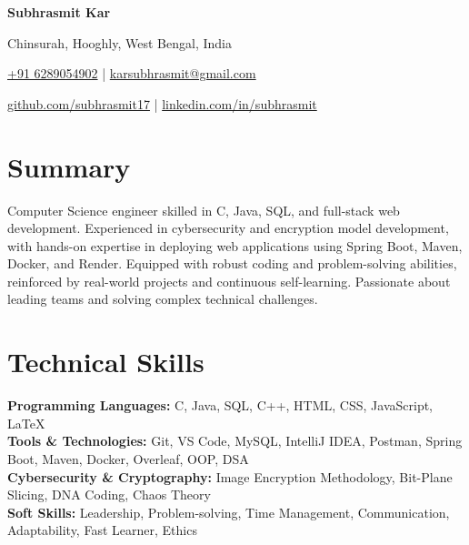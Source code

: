 \documentclass[a4paper,10pt]{article}
\begin{document}
\begin{center}
    {\fontsize{22}{24}\selectfont\textbf{Subhrasmit Kar}} \par
    
    \vspace{-0.3em}
    
    Chinsurah, Hooghly, West Bengal, India \par
    
    \vspace{-0.3em}
    
    \href{tel:+916289054902}{+91 6289054902} \quad | \quad \href{mailto:karsubhrasmit@gmail.com}{karsubhrasmit@gmail.com} \par
    
    \vspace{-0.5em}
    
    \href{https://github.com/subhrasmit17}{github.com/subhrasmit17} \quad | \quad \href{https://linkedin.com/in/subhrasmit}{linkedin.com/in/subhrasmit}
\end{center}



\vspace{-0.3em} %



\section*{Summary}
Computer Science engineer skilled in C, Java, SQL, and full-stack web development. Experienced in cybersecurity and encryption model development, with hands-on expertise in deploying web applications using Spring Boot, Maven, Docker, and Render. Equipped with robust coding and problem-solving abilities, reinforced by real-world projects and continuous self-learning. Passionate about leading teams and solving complex technical challenges.






\section*{Technical Skills}
\textbf{Programming Languages:} C, Java, SQL, C++, HTML, CSS, JavaScript, LaTeX \\[0.5em]
\textbf{Tools \& Technologies:} Git, VS Code, MySQL, IntelliJ IDEA, Postman, Spring Boot, Maven, Docker, Overleaf, OOP, DSA \\[0.5em]
\textbf{Cybersecurity \& Cryptography:} Image Encryption Methodology, Bit-Plane Slicing, DNA Coding, Chaos Theory \\[0.5em]
\textbf{Soft Skills:} Leadership, Problem-solving, Time Management, Communication, Adaptability, Fast Learner, Ethics
\end{document}
